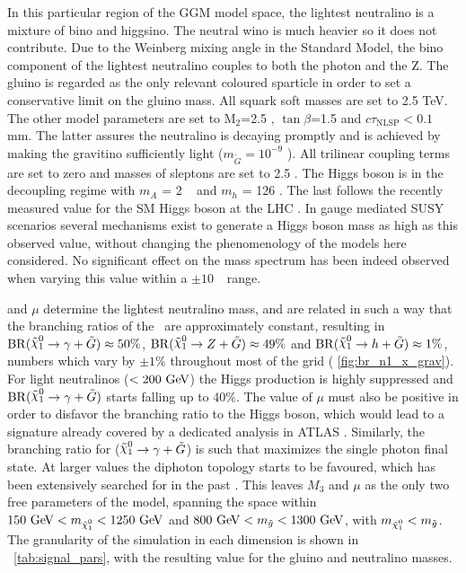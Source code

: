 In this particular region of the GGM model space, the lightest neutralino is a mixture of bino and higgsino. The neutral wino is much heavier so it
does not contribute. Due to the Weinberg mixing angle in the Standard Model, the bino component of the lightest neutralino couples to both the photon and the Z.
The gluino is regarded as the only relevant coloured sparticle in order to set a conservative limit on the gluino mass. All squark soft masses are set to 2.5 TeV.
The other model parameters are set to M$_2$=2.5 \tev, $\tan\beta$=1.5 and $c\tau_{\mathrm{NLSP}} < 0.1$ mm. The latter assures the neutralino is decaying promptly
and is achieved by making the gravitino sufficiently light ($m_{\tilde{G}}=10^{-9}$ \gev). All trilinear coupling terms are set to zero and masses of sleptons
are set to 2.5 \tev. The Higgs boson is in the decoupling regime with $m_{A}$ = 2 \tev~ and $m_{h}$ = 126 \gev. The last follows the recently measured value
for the SM Higgs boson at the LHC \cite{ATLAS-CONF-2013-014,CMS-PAS-HIG-14-009}. In gauge mediated SUSY scenarios several mechanisms exist \cite{Craig:2011yk,Auzzi:2011eu,Csaki:2012fh,Larsen:2012rq,Craig:2012hc}
to generate a Higgs boson mass as high as this observed value, without changing the phenomenology of the models here considered. No significant effect on the mass spectrum
has been indeed observed when varying this value within a $\pm 10~$ \gev\ range.

 and $\mu$ determine the lightest neutralino mass, and are related in such a way that the branching ratios of the \ninoone\ are approximately constant,
resulting in ${\rm BR}(\ninoone \to \gam + \gravino) \approx 50\%$, ${\rm BR}(\ninoone \to Z + \gravino) \approx 49\%$ and ${\rm BR}(\ninoone \to h + \gravino) \approx 1\%$,
numbers which vary by $\pm 1\%$ throughout most of the grid ({\fig} \ref{fig:br_n1_x_grav}). For light neutralinos ($<200\gev$) the Higgs production is highly
suppressed and ${\rm BR}(\ninoone \to \gam + \gravino)$ starts falling up to 40\%. The value of $\mu$ must also be positive in order to disfavor the branching ratio
to the Higgs boson, which would lead to a signature already covered by a dedicated analysis in ATLAS \cite{Aad:2012jva}. Similarly, the branching ratio for
($\ninoone \to \gam + \gravino$) is such that maximizes the single photon final state. At larger values the diphoton topology starts to be favoured, which has been
extensively searched for in the past \cite{Aad2012519,Aad:2011kz}. This leaves $M_3$ and $\mu$ as the only two free parameters of the model, spanning the space
within $150\gev < m_{\ninoone} < 1250 \gev$ and $800\gev < m_{\gluino} < 1300 \gev$, with $m_{\ninoone} < m_{\gluino}$. The granularity of the simulation in each
dimension is shown in {\tab}\ \ref{tab:signal_pars}, with the resulting value for the gluino and neutralino masses.


